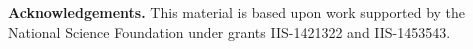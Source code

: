



\smallskip
\noindent
\textbf{Acknowledgements.}
This material is based upon work supported by the National Science Foundation under grants IIS-1421322 and IIS-1453543.


%

\balance


{
\scriptsize
{}
%


}








